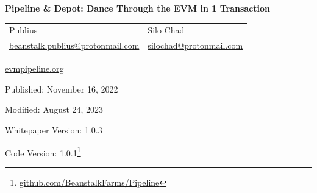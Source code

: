 \documentclass[tikz]{article}
\newcommand{\fref}[1]{\footnote{\href{http://#1}{#1}}}
\newcommand{\PipelineCover}{} %
\begin{document}
\thispagestyle{empty} %
\begin{titlepage}
    \begin{center}
        \vspace*{-0.1cm}
        \begin{changemargin}{-0.25cm}{-0.25cm}
        \centering %
        \textbf{\Large{Pipeline \& Depot: Dance Through the EVM in 1 Transaction}}
        \end{changemargin}
        \begin{center}
        \PipelineCover
        \end{center}
        \vspace{-0.1cm}

        \begin{center}
            \begin{tabular}{>{\centering\arraybackslash}p{5cm} >{\centering\arraybackslash}p{5cm}}
                \large{Publius} & \large{Silo Chad} \\
                \href{mailto:beanstalk.publius@protonmail.com}{\normalsize{beanstalk.publius@protonmail.com}} & \href{mailto:silochad@protonmail.com}{\normalsize{silochad@protonmail.com}}
            \end{tabular}
        \end{center}

        
            
        
        \vspace{-0.25cm}
        \normalsize{\href{https://evmpipeline.org/}{evmpipeline.org}}
        
        \vspace{0.2cm}
        \footnotesize{Published:} \normalsize{November 16, 2022}
        
        \vspace{-0.25cm}
        \footnotesize{Modified:} \normalsize{August 24, 2023}
        
        \vspace{-0.25cm}
        \footnotesize{Whitepaper Version:} {\normalsize{1.0.3}}
        
        \vspace{-0.25cm}
        \footnotesize{Code Version:} {\normalsize{1.0.1}}{\fref{github.com/BeanstalkFarms/Pipeline}}


\end{center}
\end{titlepage}
\end{document}

